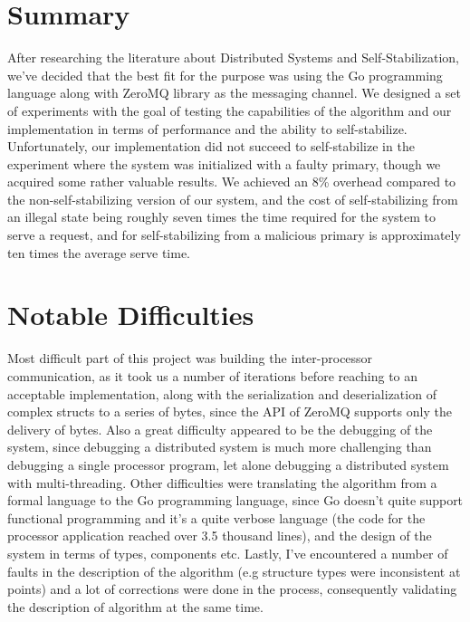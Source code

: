 \documentclass[12pt,a4paper]{report}
\begin{document}
		\section{Summary}
		After researching the literature about Distributed Systems and Self-Stabilization, we've decided that the best fit for the purpose was using the Go programming language along with ZeroMQ library as the messaging channel. We designed a set of experiments with the goal of testing the capabilities of the algorithm and our implementation in terms of performance and the ability to self-stabilize. Unfortunately, our implementation did not succeed to self-stabilize in the experiment where the system was initialized with a faulty primary, though we acquired some rather valuable results. We achieved an 8\% overhead compared to the non-self-stabilizing version of our system, and the cost of self-stabilizing from an illegal state being roughly seven times the time required for the system to serve a request, and for self-stabilizing from a malicious primary is approximately ten times the average serve time.

		\section{Notable Difficulties}
		Most difficult part of this project was building the inter-processor communication, as it took us a number of iterations before reaching to an acceptable implementation, along with the serialization and deserialization of complex structs to a series of bytes, since the API of ZeroMQ supports only the delivery of bytes. Also a great difficulty appeared to be the debugging of the system, since debugging a distributed system is much more challenging than debugging a single processor program, let alone debugging a distributed system with multi-threading. Other difficulties were translating the algorithm from a formal language to the Go programming language, since Go doesn't quite support functional programming and it's a quite verbose language (the code for the processor application reached over 3.5 thousand lines), and the design of the system in terms of types, components etc. Lastly, I've encountered a number of faults in the description of the algorithm (e.g structure types were inconsistent at points) and a lot of corrections were done in the process, consequently validating the description of algorithm at the same time.
\end{document}
